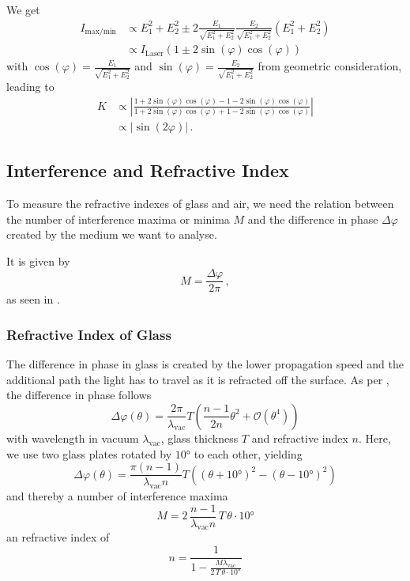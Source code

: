 We get
\begin{align*}
    I_{\text{max}/\text{min}} &\propto E^2_1 +E^2_2 \pm 2 \frac{E_1}{\sqrt{E^2_1 + E^2_2}} \frac{E_2}{\sqrt{E^2_1 + E^2_2}} (E^2_1+E^2_2) \\
    &\propto I_\text{Laser} (1 \pm 2 \sin(\varphi) \cos(\varphi))
\end{align*}
with $\cos(\varphi) = \frac{E_1}{\sqrt{E^2_1 + E^2_2}}$ and $\sin(\varphi) = \frac{E_2}{\sqrt{E^2_1 + E^2_2}}$ from geometric consideration,
leading to
\begin{align}
    K &\propto \left| \frac{1 + 2 \sin(\varphi) \cos(\varphi) - 1 - 2 \sin(\varphi) \cos(\varphi)}{1 + 2 \sin(\varphi) \cos(\varphi) + 1 - 2 \sin(\varphi) \cos(\varphi)}\right| \nonumber\\
      &\propto |\sin(2 \varphi)| \,.
      \label{eq:contrastprop}
\end{align}


\subsection{Interference and Refractive Index}
\label{subsec:intrefrac}

To measure the refractive indexes of glass and air, we need the relation between the number of interference maxima or minima $M$ and the difference in phase $\Delta\varphi$
created by the medium we want to analyse.

It is given by
\begin{equation}
    M = \frac{\Delta \varphi}{2 \pi}\,,
    \label{eq:intmax}
\end{equation} 
as seen in \cite{v64}.

\subsubsection{Refractive Index of Glass}

The difference in phase in glass is created by the lower propagation speed and the additional path the light has to travel as it is refracted off the surface.
As per \cite{v64}, the difference in phase follows
\begin{equation*}
    \Delta \varphi (\theta) = \frac{2 \pi}{\lambda_\text{vac}} T \left(\frac{n-1}{2n} \theta^2 + \mathcal{O}(\theta^4) \right)
\end{equation*}
with wavelength in vacuum $\lambda_\text{vac}$, glass thickness $T$ and refractive index $n$.
Here, we use two glass plates rotated by $10°$ to each other, yielding
\begin{equation*}
    \Delta \varphi(\theta) = \frac{\pi (n-1)}{\lambda_\text{vac} n}T \left((\theta + 10°)^2 - (\theta - 10°)^2\right)
\end{equation*}
and thereby a number of interference maxima
\begin{equation*}
    M = 2 \, \frac{n-1}{\lambda_\text{vac} n} \, T \, \theta \cdot 10°
\end{equation*}
an refractive index of
\begin{equation}
    n = \frac{1}{1 - \frac{M \lambda_\text{vac}}{2 \, T \, \theta \cdot 10°}}
    \label{eq:refractiveindexglass}
\end{equation}

